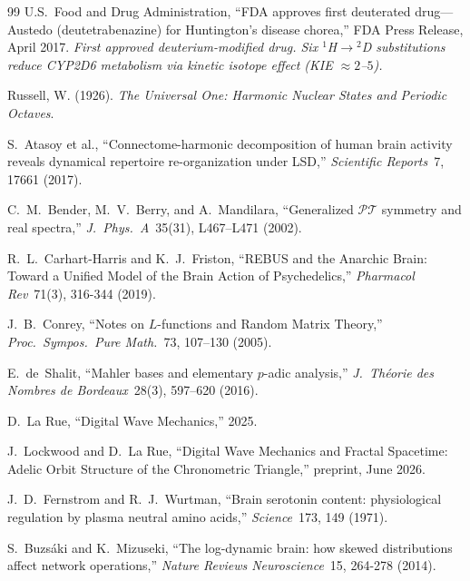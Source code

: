 \vspace{2em}
\begin{thebibliography}{99}
U.S.~Food and Drug Administration,
``FDA approves first deuterated drug---Austedo (deutetrabenazine) for Huntington's disease chorea,''
FDA Press Release, April 2017.
\textit{First approved deuterium-modified drug. Six ${}^1$H$\to$${}^2$D substitutions reduce CYP2D6 metabolism via kinetic isotope effect (KIE $\approx 2$--$5$).}


Russell, W. (1926).
\textit{The Universal One: Harmonic Nuclear States and Periodic Octaves}.

S.~Atasoy et al., ``Connectome-harmonic decomposition of human brain activity reveals dynamical repertoire re-organization under LSD,'' \emph{Scientific Reports}\ 7, 17661 (2017).

C.~M.~Bender, M.~V.~Berry, and A.~Mandilara, ``Generalized $\mathcal{PT}$ symmetry and real spectra,'' \emph{J.\ Phys.\ A}\ 35(31), L467--L471 (2002).

R.~L.~Carhart-Harris and K.~J.~Friston, ``REBUS and the Anarchic Brain: Toward a Unified Model of the Brain Action of Psychedelics,'' \emph{Pharmacol Rev}\ 71(3), 316-344 (2019).

J.~B.~Conrey, ``Notes on $L$-functions and Random Matrix Theory,'' \emph{Proc.\ Sympos.\ Pure Math.}\ 73, 107--130 (2005).

E.~de~Shalit, ``Mahler bases and elementary $p$-adic analysis,'' \emph{J.\ Th\'eorie des Nombres de Bordeaux}\ 28(3), 597--620 (2016).

D.~La Rue,
``Digital Wave Mechanics,'' 2025.

J.~Lockwood and D.~La Rue, ``Digital Wave Mechanics and Fractal Spacetime: Adelic Orbit Structure of the Chronometric Triangle,'' preprint, June 2026.

J.~D.~Fernstrom and R.~J.~Wurtman, ``Brain serotonin content: physiological regulation by plasma neutral amino acids,'' \emph{Science}\ 173, 149 (1971).

S.~Buzs\'aki and K.~Mizuseki, ``The log-dynamic brain: how skewed distributions affect network operations,'' \emph{Nature Reviews Neuroscience}\ 15, 264-278 (2014).


\end{thebibliography}
